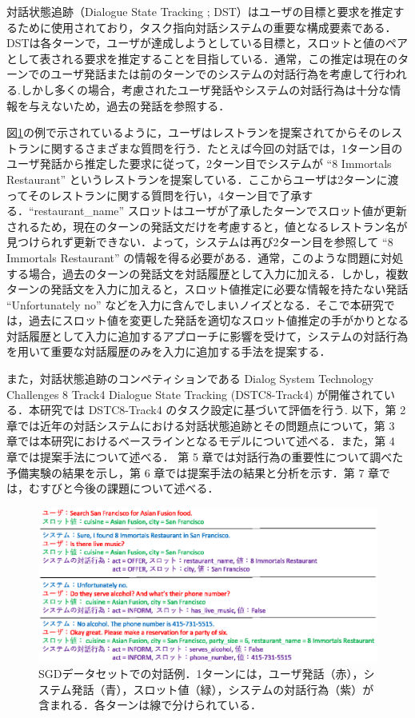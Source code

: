 対話状態追跡（Dialogue State Tracking ; DST）はユーザの目標と要求を推定するために使用されており，タスク指向対話システムの重要な構成要素である．DSTは各ターンで，ユーザが達成しようとしている目標と，スロットと値のペアとして表される要求を推定することを目指している．通常，この推定は現在のターンでのユーザ発話または前のターンでのシステムの対話行為を考慮して行われる.しかし多くの場合，考慮されたユーザ発話やシステムの対話行為は十分な情報を与えないため，過去の発話を参照する．\par
図\ref{fig:taiwa}の例で示されているように，ユーザはレストランを提案されてからそのレストランに関するさまざまな質問を行う．たとえば今回の対話では，1ターン目のユーザ発話から推定した要求に従って，2ターン目でシステムが “8 Immortals Restaurant” というレストランを提案している．ここからユーザは2ターンに渡ってそのレストランに関する質問を行い，4ターン目で了承する．“restaurant\_name” スロットはユーザが了承したターンでスロット値が更新されるため，現在のターンの発話文だけを考慮すると，値となるレストラン名が見つけられず更新できない．よって，システムは再び2ターン目を参照して “8 Immortals Restaurant” の情報を得る必要がある．通常，このような問題に対処する場合，過去のターンの発話文を対話履歴として入力に加える．しかし，複数ターンの発話文を入力に加えると，スロット値推定に必要な情報を持たない発話 “Unfortunately no” などを入力に含んでしまいノイズとなる．そこで本研究では，過去にスロット値を変更した発話を適切なスロット値推定の手がかりとなる対話履歴として入力に追加するアプローチ\cite{kanren}に影響を受けて，システムの対話行為を用いて重要な対話履歴のみを入力に追加する手法を提案する．\par
また，対話状態追跡のコンペティションである  Dialog System Technology Challenges 8 Track4 Dialogue State Tracking (DSTC8-Track4)\cite{dstc8} が開催されている．本研究では DSTC8-Track4 のタスク設定に基づいて評価を行う.
以下，第 2 章では近年の対話システムにおける対話状態追跡とその問題点について，第 3 章では本研究におけるベースラインとなるモデルについて述べる．また，第 4 章では提案手法について述べる．
第 5 章では対話行為の重要性について調べた予備実験の結果を示し，第 6 章では提案手法の結果と分析を示す．第 7 章では，むすびと今後の課題について述べる．

\begin{figure}[t]
  \centering
  \includegraphics[width=15cm]{chapter1/taiwarei3.eps}
  \caption{SGDデータセットでの対話例．1ターンには，ユーザ発話（赤），システム発話（青），スロット値（緑），システムの対話行為（紫）が含まれる．各ターンは線で分けられている．}
  \label{fig:taiwa}
\end{figure}
